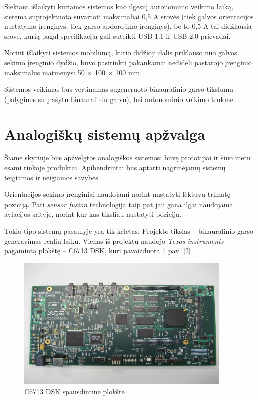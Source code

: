 \documentclass[]{vgtuef}
\begin{document}
Siekiant išlaikyti kuriamos sistemos kuo ilgesnį autonominio veikimo laiką, sistema suprojektuota suvartoti maksimaliai 0,5 A srovės (tiek galvos orientacijos nustatymo įrenginys, tiek garso apdorojimo įrenginys), be to 0,5 A tai didžiausia srovė, kurią pagal specifikaciją gali suteikti USB 1.1 ir USB 2.0 prievadai.

Norint išlaikyti sistemos mobilumą, kurio didžioji dalis priklauso nuo galvos sekimo įrenginio dydžio, buvo pasirinkti pakankamai nedideli pastarojo įrenginio maksimalūs matmenys: 50 $\times$ 100 $\times$ 100 mm.

Sistemos veikimas bus vertinamas sugeneruoto binauralinio garso tikslumu (palyginus su įrašytu binauraliniu garsu), bei autonominio veikimo trukme.


\section{Analogiškų sistemų apžvalga}

Šiame skyriuje bus apžvelgtos analogiškos sistemos: buvę prototipai ir šiuo metu esami rinkoje produktai. Apibendrintai bus aptarti nagrinėjamų sistemų teigiamos ir neigiamos savybės. 


Orientacijos sekimo įrenginiai naudojami norint nustatyti lėktuvų  trimatę poziciją. Pati \textit{sensor fusion} technologija taip pat jau gana ilgai naudojama aviacijos srityje, norint kur kas tiksliau nustatyti poziciją.

Tokio tipo sistemų pasaulyje yra tik keletas. Projekto tikslas – binauralinio garso generavimas realiu laiku. Vienas iš projektų naudojo \textit{Texas instruments} pagamintą plokštę -- C6713 DSK, kuri pavaizduota \ref{fig:C6713_dsk_board} pav. [2]

\begin{figure}[!ht]
  \centering
  \includegraphics[width=390px]{img/c6713.jpg}
  \caption{C6713 DSK spausdintinė plokštė}
  \label{fig:C6713_dsk_board}
\end{figure}
\end{document}
